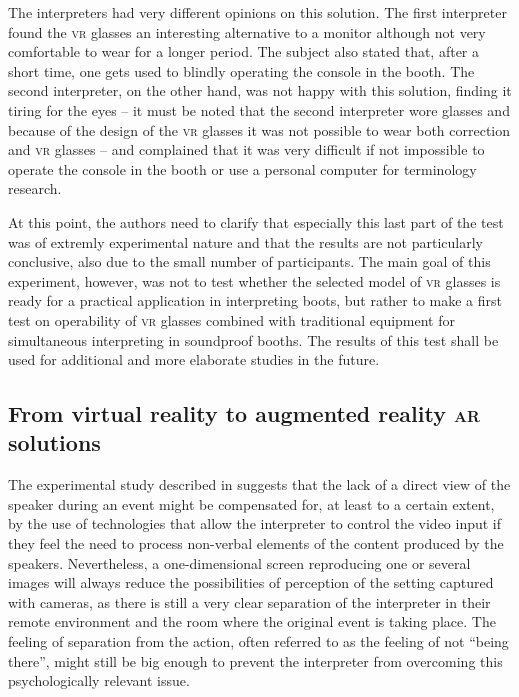 \documentclass[output=paper]{langsci/langscibook}
\begin{document}
The interpreters had very different opinions on this solution. The first interpreter found the \textsc{vr} glasses an interesting alternative to a monitor although not very comfortable to wear for a longer period. The subject also stated that, after a short time, one gets used to blindly operating the console in the booth. The second interpreter, on the other hand, was not happy with this solution, finding it tiring for the eyes -- it must be noted that the second interpreter wore glasses and because of the design of the \textsc{vr} glasses it was not possible to wear both correction and \textsc{vr} glasses -- and complained that it was very difficult if not impossible to operate the console in the booth or use a personal computer for terminology research.

At this point, the authors need to clarify that especially this last part of the test was of extremly experimental nature and that the results are not particularly conclusive, also due to the small number of participants. The main goal of this experiment, however, was not to test whether the selected model of \textsc{vr} glasses is ready for a practical application in interpreting boots, but rather to make a first test on operability of \textsc{vr} glasses combined with traditional equipment for simultaneous interpreting in soundproof booths. The results of this test shall be used for additional and more elaborate studies in the future.

\subsection{From virtual reality to augmented reality \textsc{ar} solutions}

The experimental study described in  suggests that the lack of a direct view of the speaker during an event might be compensated for, at least to a certain extent, by the use of technologies that allow the interpreter to control the video input if they feel the need to process non-verbal elements of the content produced by the speakers. Nevertheless, a one-dimensional screen reproducing one or several images will always reduce the possibilities of perception of the setting captured with cameras, as there is still a very clear separation of the interpreter in their remote environment and the room where the original event is taking place. The feeling of separation from the action, often referred to as the feeling of not “being there”, might still be big enough to prevent the interpreter from overcoming this psychologically relevant issue. 
\end{document}
